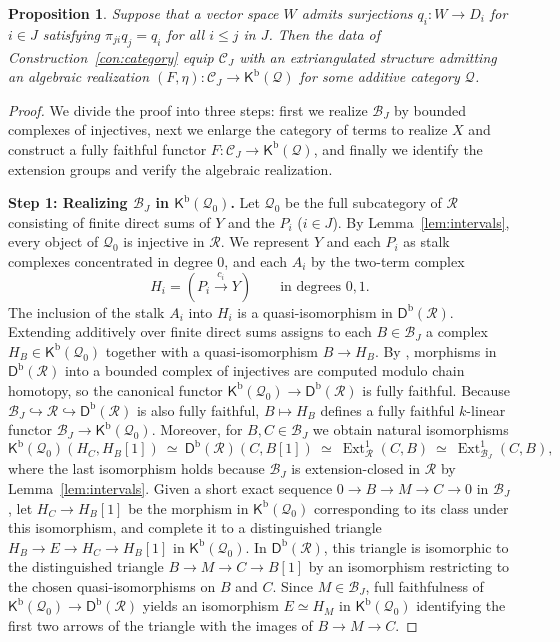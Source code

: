 \documentclass[a4paper,reqno,10pt]{amsart}
\numberwithin{equation}{section}
\newtheorem{proposition}[theorem]{Proposition}
\theoremstyle{definition}
\newcommand{\B}{\mathcal B}
\newcommand{\C}{\mathcal C}
\newcommand{\Q}{\mathcal Q}
\newcommand{\Rcat}{\mathcal R}
\newcommand{\Kb}{\mathsf K^{\mathrm b}}
\newcommand{\Db}{\mathsf D^{\mathrm b}}
\DeclareMathOperator{\Ext}{Ext}
\begin{document}
\begin{proposition}\label{prop:complex}
Suppose that a vector space $W$ admits surjections $q_i:W\to D_i$ for
$i\in J$ satisfying $\pi_{ji}q_j=q_i$ for all $i\le j$ in $J$.
Then the data of Construction~\ref{con:category} equip $\C_J$ with an
extriangulated structure admitting an algebraic realization
$(F,\eta):\C_J\to\Kb(\Q)$ for some additive category $\Q$.
\end{proposition}
\begin{proof}
We divide the proof into three steps: first we realize $\B_J$ by bounded
complexes of injectives, next we enlarge the category of terms to realize $X$
and construct a fully faithful functor $F:\C_J\to\Kb(\Q)$, and finally we
identify the extension groups and verify the algebraic realization.

\medskip\noindent\textbf{Step 1: Realizing $\B_J$ in $\Kb(\Q_0)$.}
Let $\Q_0$ be the full subcategory of $\Rcat$ consisting of finite direct sums
of $Y$ and the $P_i$ ($i\in J$). By Lemma~\ref{lem:intervals}, every object of
$\Q_0$ is injective in $\Rcat$. We represent $Y$ and each $P_i$ as stalk
complexes concentrated in degree $0$, and each $A_i$ by the two-term complex
\[
    H_i=(P_i\xrightarrow{c_i}Y)\qquad\text{in degrees }0,1.
\]
The inclusion of the stalk $A_i$ into $H_i$ is a quasi-isomorphism in
$\Db(\Rcat)$. Extending additively over finite direct sums assigns to each
$B\in\B_J$ a complex $H_B\in\Kb(\Q_0)$ together with a quasi-isomorphism
$B\to H_B$. By \cite[Tag 05TG]{Stacks}, morphisms in $\Db(\Rcat)$ into a
bounded complex of injectives are computed modulo chain homotopy, so the
canonical functor $\Kb(\Q_0)\to\Db(\Rcat)$ is fully faithful. Because
$\B_J\hookrightarrow\Rcat\hookrightarrow\Db(\Rcat)$ is also fully faithful,
$B\mapsto H_B$ defines a fully faithful $k$-linear functor
$\B_J\to\Kb(\Q_0)$. Moreover, for $B,C\in\B_J$ we obtain natural isomorphisms
\[
  \Kb(\Q_0)(H_C,H_B[1])
     \ \simeq\ \Db(\Rcat)(C,B[1])
     \ \simeq\ \Ext^1_{\Rcat}(C,B)
     \ \simeq\ \Ext^1_{\B_J}(C,B),
\]
where the last isomorphism holds because $\B_J$ is extension-closed in $\Rcat$
by Lemma~\ref{lem:intervals}. Given a short exact sequence
$0\to B\to M\to C\to0$ in $\B_J$, let $H_C\to H_B[1]$ be the morphism in
$\Kb(\Q_0)$ corresponding to its class under this isomorphism, and complete it
to a distinguished triangle $H_B\to E\to H_C\to H_B[1]$ in $\Kb(\Q_0)$. In
$\Db(\Rcat)$, this triangle is isomorphic to the distinguished triangle
$B\to M\to C\to B[1]$ by an isomorphism restricting to the chosen
quasi-isomorphisms on $B$ and $C$. Since $M\in\B_J$, full faithfulness of
$\Kb(\Q_0)\to\Db(\Rcat)$ yields an isomorphism $E\simeq H_M$ in $\Kb(\Q_0)$
identifying the first two arrows of the triangle with the images of
$B\to M\to C$.


\end{proof}
\end{document}
